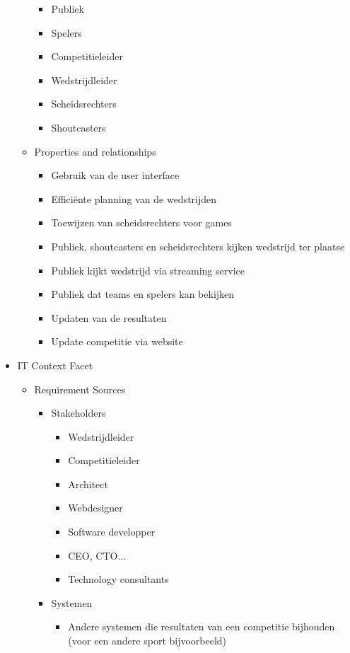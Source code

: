 \documentclass[12pt,a4paper]{article}
\begin{document}
\begin{itemize}
\begin{itemize}
				\begin{itemize}
					\item Publiek
					\item Spelers
					\item Competitieleider
					\item Wedstrijdleider
					\item Scheidsrechters
					\item Shoutcasters
				\end{itemize}
				\item Properties and relationships
				\begin{itemize}
					\item Gebruik van de user interface
					\item Efficiënte planning van de wedstrijden
					\item Toewijzen van scheidsrechters voor games
					\item Publiek, shoutcasters en scheidsrechters kijken wedstrijd ter plaatse
					\item Publiek kijkt wedstrijd via streaming service
					\item Publiek dat teams en spelers kan bekijken
					\item Updaten van de resultaten
					\item Update competitie via website
				\end{itemize}
			\end{itemize}
			\item IT Context Facet
			\begin{itemize}
				\item Requirement Sources
				\begin{itemize}
					\item Stakeholders
					\begin{itemize}
						\item Wedstrijdleider
						\item Competitieleider
						\item Architect
						\item Webdesigner
						\item Software developper
						\item CEO, CTO...
						\item Technology consultants
					\end{itemize}
					\item Systemen
					\begin{itemize}
						\item Andere systemen die resultaten van een competitie bijhouden (voor een andere sport bijvoorbeeld)

\end{itemize}
\end{itemize}
\end{itemize}
\end{itemize}
\end{document}
